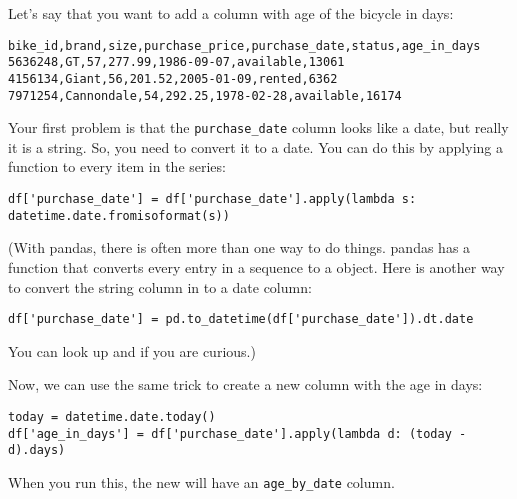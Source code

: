 Let's say that you want to add a column with age of the bicycle in days:
\begin{Verbatim}
bike_id,brand,size,purchase_price,purchase_date,status,age_in_days
5636248,GT,57,277.99,1986-09-07,available,13061
4156134,Giant,56,201.52,2005-01-09,rented,6362
7971254,Cannondale,54,292.25,1978-02-28,available,16174
\end{Verbatim}

Your first problem is that the \texttt{purchase\_date} column looks
like a date, but really it is a string. So, you need to convert it to a
date.  You can do this by applying a function to every item in the series:
\begin{Verbatim}
df['purchase_date'] = df['purchase_date'].apply(lambda s: datetime.date.fromisoformat(s))
\end{Verbatim}

(With pandas, there is often more than one way to do things.  pandas
has a  function that converts every entry in
a sequence to a  object. Here is another way to
convert the string column in to a date column:
\begin{Verbatim}
df['purchase_date'] = pd.to_datetime(df['purchase_date']).dt.date
\end{Verbatim}
You can look up  and  if you are curious.)

Now, we can use the same trick to create a new column with the age in days:
\begin{Verbatim}
today = datetime.date.today()
df['age_in_days'] = df['purchase_date'].apply(lambda d: (today - d).days)
\end{Verbatim}

When you run this, the new  will have an \texttt{age\_by\_date} column.





